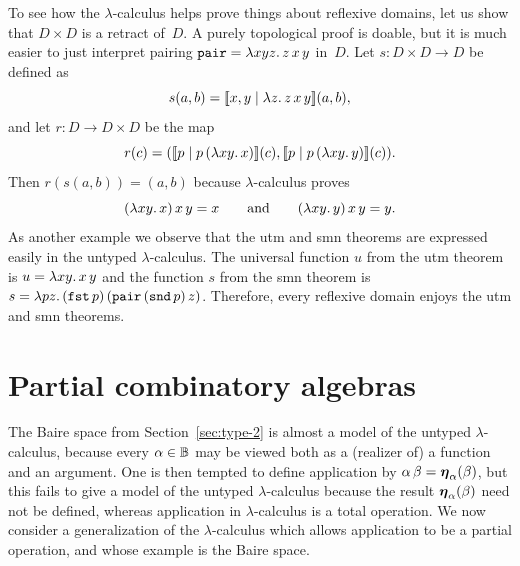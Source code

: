 To see how the $\lambda$-calculus helps prove things about reflexive
domains, let us show that $D \times D$ is a retract of~$D$. A purely
topological proof is doable, but it is much easier to just interpret
pairing $\mathtt{pair} = \lambda x y z .\,z\,x\,y$ in~$D$. Let $s : D
\times D \to D$ be defined as
%
\begin{equation*}
  s (a, b) = [\![x,y \mid \lambda z .\,z\,x\,y]\!](a,b),
\end{equation*}
%
and let $r : D \to D \times D$ be the map
%
\begin{equation*}
  r(c) = ([\![p \mid p\,(\lambda x y .\,x)]\!](c),
          [\![p \mid p\,(\lambda x y .\,y)]\!](c)).
\end{equation*}
%
Then $r (s (a, b)) = (a, b)$ because $\lambda$-calculus proves
%
\begin{equation*}
  (\lambda x y .\,x)\, x \, y = x
  \qquad\text{and}\qquad
  (\lambda x y .\,y)\, x \, y = y.
\end{equation*}
%
As another example we observe that the utm and smn theorems are
expressed easily in the untyped $\lambda$-calculus. The universal
function $u$ from the utm theorem is $u = \lambda x y .\,x\, y$ and the
function $s$ from the smn theorem is $s = \lambda p
  z .\,(\mathtt{fst}\,p)\,(\mathtt{pair}\,(\mathtt{snd}\, p)\,z)$.
Therefore, every reflexive domain enjoys the utm and smn theorems.


\section{Partial combinatory algebras}
\label{sec:pcas}

The Baire space from Section~\ref{sec:type-2} is almost a model of the
untyped $\lambda$-calculus, because every $\alpha \in \mathbb{B}$ may be
viewed both as a (realizer of) a function and an argument. One is then
tempted to define application by $\alpha \, \beta =
\text{\boldmath{$\eta$}}_{\alpha}(\beta)$, but this fails to give a model of the untyped
$\lambda$-calculus because the result $\text{\boldmath{$\eta$}}_{\alpha}(\beta)$ need not
be defined, whereas application in $\lambda$-calculus is a total
operation. We now consider a generalization of the $\lambda$-calculus
which allows application to be a partial operation, and whose example
is the Baire space.

